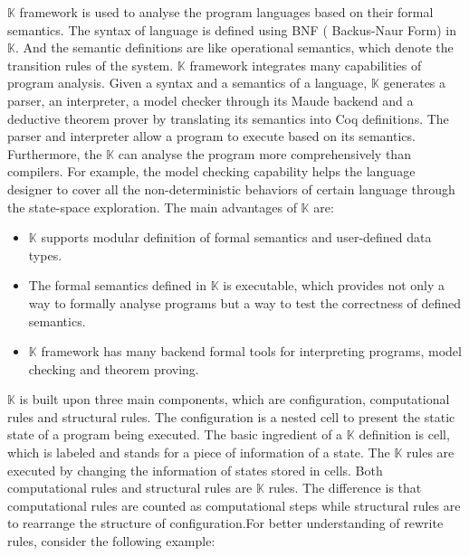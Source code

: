 \documentclass[letterpaper, 10 pt, conference]{IEEEtran}
\begin{document}
 $\mathbb{K}$ framework is used to analyse the program languages based on their formal semantics. The syntax of language is defined using BNF ( Backus-Naur Form) in $\mathbb{K}$. And the semantic definitions are like operational semantics, which denote the transition rules of the system. $\mathbb{K}$ framework integrates many capabilities of program analysis. Given a syntax and a semantics of a language, $\mathbb{K}$ generates a parser, an interpreter, a model checker through its Maude backend and a deductive theorem prover by translating its semantics into Coq definitions. The parser and interpreter allow a program to execute based on its semantics. Furthermore, the $\mathbb{K}$ can analyse the program more comprehensively than compilers. For example, the model checking capability helps the language designer to cover all the non-deterministic behaviors of certain language through the state-space exploration. The main advantages of $\mathbb{K}$ are:
\begin{itemize}
\item $\mathbb{K}$ supports modular definition of formal semantics and user-defined data types.
\item The formal semantics defined in $\mathbb{K}$ is executable, which provides not only a way to formally analyse programs but a way to test the correctness of defined semantics.
\item $\mathbb{K}$ framework has many backend formal tools for interpreting programs, model checking and theorem proving.
\end{itemize}
\par $\mathbb{K}$ is built upon three main components, which are configuration, computational rules and structural rules. The configuration is a nested cell to present the static state of a program being executed. The basic ingredient of a $\mathbb{K}$ definition is cell, which is labeled and stands for a piece of information of a state. The $\mathbb{K}$ rules are executed by changing the information of states stored in cells. Both computational rules and structural rules are $\mathbb{K}$ rules. The difference is that computational rules are counted as computational steps while structural rules are to rearrange the structure of configuration.For better understanding
of rewrite rules, consider the following example:
\end{document}
